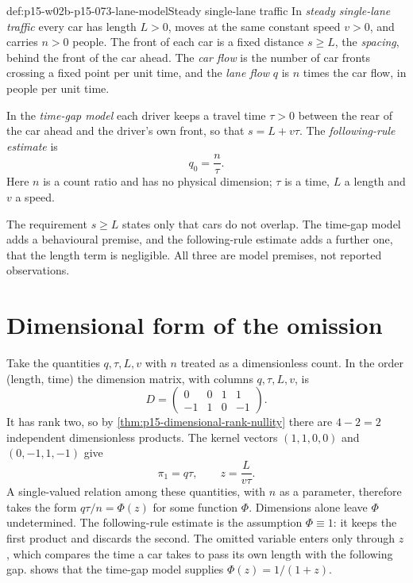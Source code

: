 \begin{hbdefinition}{def:p15-w02b-p15-073-lane-model}{Steady single-lane traffic}
In \emph{steady single-lane traffic} every car has length \(L>0\), moves at
the same constant speed \(v>0\), and carries \(n>0\) people. The front of
each car is a fixed distance \(s\geq L\), the \emph{spacing}, behind the front
of the car ahead. The \emph{car flow} is the number of car fronts crossing a
fixed point per unit time, and the \emph{lane flow} \(q\) is \(n\) times the
car flow, in people per unit time.

In the \emph{time-gap model} each driver keeps a travel time \(\tau>0\)
between the rear of the car ahead and the driver's own front, so that
\(s=L+v\tau\). The \emph{following-rule estimate} is
\[
 q_0=\frac n\tau .
\]
Here \(n\) is a count ratio and has no physical dimension; \(\tau\) is a
time, \(L\) a length and \(v\) a speed.
\end{hbdefinition}

The requirement \(s\geq L\) states only that cars do not overlap. The
time-gap model adds a behavioural premise, and the following-rule estimate
adds a further one, that the length term is negligible. All three are
model premises, not reported observations.

\section{Dimensional form of the omission}
\label{sec:p15-w02b-p15-073-dimensions}

Take the quantities \(q,\tau,L,v\) with \(n\) treated as a dimensionless
count. In the order (length, time) the dimension matrix, with columns
\(q,\tau,L,v\), is
\[
 D=\begin{pmatrix}0&0&1&1\\-1&1&0&-1\end{pmatrix}.
\]
It has rank two, so by \cref{thm:p15-dimensional-rank-nullity} there are
\(4-2=2\) independent dimensionless products. The kernel vectors
\((1,1,0,0)\) and \((0,-1,1,-1)\) give
\[
 \pi_1=q\tau,\qquad z=\frac{L}{v\tau}.
\]
A single-valued relation among these quantities, with \(n\) as a parameter,
therefore takes the form \(q\tau/n=\Phi(z)\) for some function \(\Phi\).
Dimensions alone leave \(\Phi\) undetermined. The following-rule estimate is
the assumption \(\Phi\equiv1\): it keeps the first product and discards the
second. The omitted variable enters only through \(z\), which compares the
time a car takes to pass its own length with the following gap.
 shows that the time-gap model supplies
\(\Phi(z)=1/(1+z)\).

